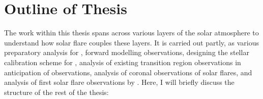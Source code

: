 
\section{Outline of Thesis}\label{sec:outline}

The work within this thesis spans across various layers of the solar atmosphere to understand how solar flare couples these layers. It is carried out partly, as various preparatory analysis for {\suit}, forward modelling {\suit} observations, designing the stellar calibration scheme for {\suit}, analysis of existing transition region observations in anticipation of {\suit} observations, analysis of coronal observations of solar flares, and analysis of first solar flare observations by {\suit}. Here, I will briefly discuss the structure of the rest of the thesis: 

